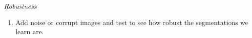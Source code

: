 \noindent \textit{Robustness}
\begin{enumerate}
\item Add noise or corrupt images and test to see how robust the segmentations we learn are.
\end{enumerate}
\fi

\iffalse
\subsection{Discussion}
\begin{enumerate}
\item How successful was our unsupervised approach in learning meaningful segmentations
\item RGB videos vs. RGB-D videos
\end{enumerate}
\fi
